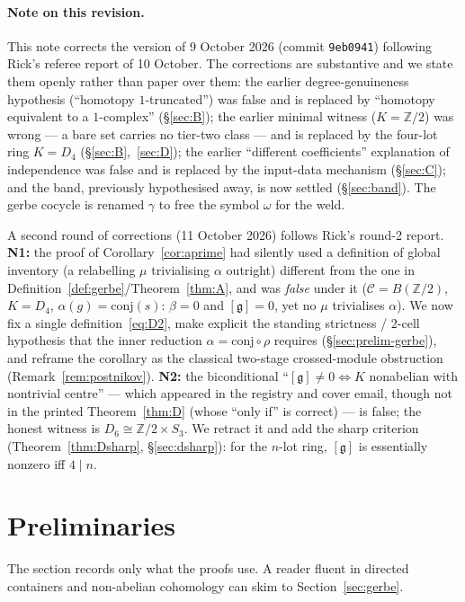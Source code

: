 \documentclass[11pt]{article}
\theoremstyle{definition}
\newcommand{\C}{\mathcal{C}}
\newcommand{\Z}{\mathbb{Z}}
\newcommand{\gerbe}{\mathfrak{g}}
\begin{document}
\paragraph{Note on this revision.}
This note corrects the version of 9 October 2026 (commit \texttt{9eb0941}) following Rick's
referee report of 10 October. The corrections are substantive and we state them openly rather
than paper over them: the earlier degree-genuineness hypothesis (``homotopy $1$-truncated'')
was false and is replaced by ``homotopy equivalent to a $1$-complex''
(\S\ref{sec:B}); the earlier minimal witness ($K=\Z/2$) was wrong --- a bare set carries no
tier-two class --- and is replaced by the four-lot ring $K=D_4$ (\S\ref{sec:B},~\ref{sec:D}); the
earlier ``different coefficients'' explanation of independence was false and is replaced by the
input-data mechanism (\S\ref{sec:C}); and the band, previously hypothesised away, is now settled
(\S\ref{sec:band}). The gerbe cocycle is renamed $\gamma$ to free the symbol $\omega$ for the weld.

A second round of corrections (11 October 2026) follows Rick's round-2 report. \textbf{N1:} the
proof of Corollary~\ref{cor:aprime} had silently used a definition of global inventory
(a relabelling $\mu$ trivialising $\alpha$ outright) different from the one in
Definition~\ref{def:gerbe}/Theorem~\ref{thm:A}, and was \emph{false} under it ($\C=B(\Z/2)$,
$K=D_4$, $\alpha(g)=\mathrm{conj}(s)$: $\beta=0$ and $[\gerbe]=0$, yet no $\mu$ trivialises
$\alpha$). We now fix a single definition~\eqref{eq:D2}, make explicit the standing strictness /
$2$-cell hypothesis that the inner reduction $\alpha=\mathrm{conj}\circ\rho$ requires
(\S\ref{sec:prelim-gerbe}), and reframe the corollary as the classical two-stage crossed-module
obstruction (Remark~\ref{rem:postnikov}). \textbf{N2:} the biconditional
``$[\gerbe]\neq0\iff K$ nonabelian with nontrivial centre'' --- which appeared in the registry and
cover email, though not in the printed Theorem~\ref{thm:D} (whose ``only if'' is correct) --- is
false; the honest witness is $D_6\cong\Z/2\times S_3$. We retract it and add the sharp criterion
(Theorem~\ref{thm:Dsharp}, \S\ref{sec:dsharp}): for the $n$-lot ring, $[\gerbe]$ is essentially
nonzero iff $4\mid n$.

\section{Preliminaries}\label{sec:prelim}

The section records only what the proofs use. A reader fluent in directed containers and
non-abelian cohomology can skim to Section~\ref{sec:gerbe}.
\end{document}
